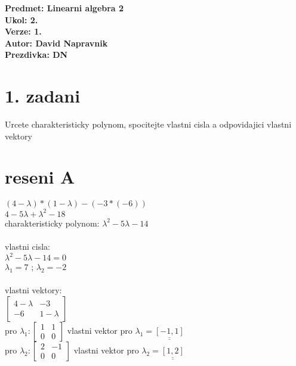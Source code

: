 \documentclass[a4paper]{article}
\def\doubleunderline#1{\underline{\underline{#1}}}
\begin{document}
\noindent
\textbf{Predmet: Linearni algebra 2}\\
\textbf{Ukol: 2.}\\
\textbf{Verze: 1.}\\
\textbf{Autor: David Napravnik}\\
\textbf{Prezdivka: DN}

\section*{1. zadani}
Urcete charakteristicky polynom, spocitejte vlastni cisla a odpovidajici vlastni vektory

\section*{reseni A}
$(4-\lambda)*(1-\lambda)-(-3 * (-6))$\\
$4-5\lambda+\lambda^2-18$\\
charakteristicky polynom: \doubleunderline{$\lambda^2-5\lambda-14$}\\
\\
vlastni cisla:\\
$\lambda^2-5\lambda-14=0$\\
\doubleunderline{$\lambda_1 = 7$} ; 
\doubleunderline{$\lambda_2 = -2$}\\
\\
vlastni vektory:\\
$
\left[\begin{matrix}
	4-\lambda & -3\\
	-6 & 1-\lambda
	\end{matrix}\right]
$\\
pro $\lambda_1: \left[\begin{matrix}
	1 & 1\\
	0 & 0
	\end{matrix}\right]$
vlastni vektor pro $\lambda_1 = \doubleunderline{[-1,1]}$\\
pro $\lambda_2: \left[\begin{matrix}
	2 & -1\\
	0 & 0
	\end{matrix}\right]$
vlastni vektor pro $\lambda_2 = \doubleunderline{[1,2]}$\\
\end{document}
